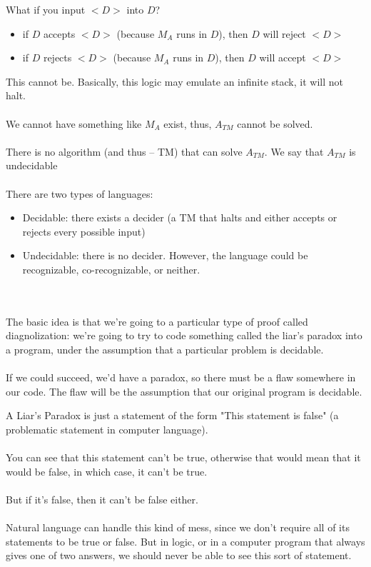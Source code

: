 \documentclass[12pt]{article}
\begin{document}
What if you input $<D>$ into $D$?
\begin{itemize}
    \item if $D$ accepts $<D>$ (because $M_A$ runs in $D$), then $D$ will reject $<D>$
    \item if $D$ rejects $<D>$ (because $M_A$ runs in $D$), then $D$ will accept $<D>$
\end{itemize}
This cannot be. Basically, this logic may emulate an infinite stack, it will not halt.
\\
\\
We cannot have something like $M_A$ exist, thus, $A_{TM}$ cannot be solved.
\\
\\
There is no algorithm (and thus -- TM) that can solve $A_{TM}$. We say that $A_{TM}$ is undecidable
\\
\\
There are two types of languages:
\begin{itemize}
    \item Decidable: there exists a decider (a TM that halts and either accepts or rejects every possible input)
    \item Undecidable: there is no decider. However, the language could be recognizable, co-recognizable, or neither.
\end{itemize}
\\
\\
The basic idea is that we're going to a particular type of proof called diagnolization: we're going to try to code something called the liar's paradox into a program, under the assumption that a particular problem is decidable.
\\
\\
If we could succeed, we'd have a paradox, so there must be a flaw somewhere in our code. The flaw will be the assumption that our original program is decidable.

\begin{tcolorbox}
 A Liar's Paradox is just a statement of the form "This statement is false" (a problematic statement in computer language).
 \\
 \\
 You can see that this statement can't be true, otherwise that would mean that it would be false, in which case, it can't be true.
 \\
 \\
 But if it's false, then it can't be false either.
 \\
 \\
 Natural language can handle this kind of mess, since we don't require all of its statements to be true or false. But in logic, or in a computer program that always gives one of two answers, we should never be able to see this sort of statement.
\end{tcolorbox}
\end{document}
